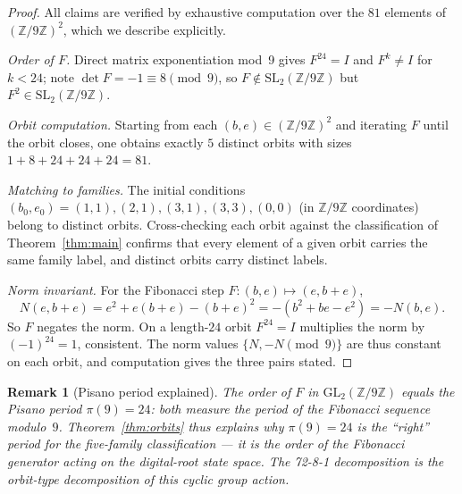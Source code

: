 \documentclass[12pt]{article}
\newtheorem{remark}{Remark}
\begin{document}
\begin{proof}
All claims are verified by exhaustive computation over the $81$ elements of $(\mathbb{Z}/9\mathbb{Z})^2$, which we describe explicitly.

\emph{Order of $F$.}  Direct matrix exponentiation mod~9 gives $F^{24}=I$ and $F^k\neq I$ for $k<24$; note $\det F = -1\equiv 8\pmod{9}$, so $F\notin\mathrm{SL}_2(\mathbb{Z}/9\mathbb{Z})$ but $F^2\in\mathrm{SL}_2(\mathbb{Z}/9\mathbb{Z})$.

\emph{Orbit computation.}  Starting from each $(b,e)\in(\mathbb{Z}/9\mathbb{Z})^2$ and iterating $F$ until the orbit closes, one obtains exactly $5$ distinct orbits with sizes $1+8+24+24+24=81$.

\emph{Matching to families.}  The initial conditions $(b_0,e_0)=(1,1),(2,1),(3,1),(3,3),(0,0)$ (in $\mathbb{Z}/9\mathbb{Z}$ coordinates) belong to distinct orbits.  Cross-checking each orbit against the classification of Theorem~\ref{thm:main} confirms that every element of a given orbit carries the same family label, and distinct orbits carry distinct labels.

\emph{Norm invariant.}  For the Fibonacci step $F:(b,e)\mapsto(e,b+e)$,
\[
  N(e,b+e) = e^2+e(b+e)-(b+e)^2 = -(b^2+be-e^2) = -N(b,e).
\]
So $F$ negates the norm.  On a length-$24$ orbit $F^{24}=I$ multiplies the norm by $(-1)^{24}=1$, consistent.  The norm values $\{N,-N\pmod{9}\}$ are thus constant on each orbit, and computation gives the three pairs stated.
\end{proof}

\begin{remark}[Pisano period explained]
The order of $F$ in $\mathrm{GL}_2(\mathbb{Z}/9\mathbb{Z})$ equals the Pisano period $\pi(9)=24$: both measure the period of the Fibonacci sequence modulo~$9$.  Theorem~\ref{thm:orbits} thus explains \emph{why} $\pi(9)=24$ is the ``right'' period for the five-family classification --- it is the order of the Fibonacci generator acting on the digital-root state space.  The 72-8-1 decomposition is the orbit-type decomposition of this cyclic group action.
\end{remark}
\end{document}
